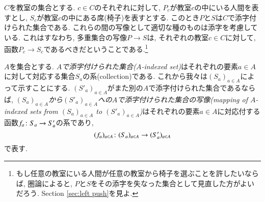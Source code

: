 \begin{example}\label{ex:classroom seats}


$C$を教室の集合とする. $c\in C$のそれぞれに対して, $P_c$が教室$c$の中にいる人間を表すとし, $S_c$が教室$c$の中にある席(椅子)を表すとする. このとき$P$と$S$は$C$で添字付けられた集合である. これらの間の写像として適切な種のものは添字を考慮している. これはすなわち, 多重集合の写像$P\to S$は, それぞれの教室$c\in C$に対して, 函数$P_c\to S_c$であるべきだということである.\footnote{もし任意の教室にいる人間が任意の教室から椅子を選ぶことを許したいならば, 圏論によると, $P$と$S$をその添字を失なった集合として見直した方がよいだろう. Section \ref{sec:left push}を見よ.}

\end{example}

\begin{definition}\label{def:indexed sets}


$A$を集合とする. \emph{$A$で添字付けられた集合($A$-indexed set)}はそれぞれの要素$a\in A$に対して対応する集合$S_a$の系(collection)である. これから我々は$(S_a)_{a\in A}$によって示すことにする. $(S'_a)_{a\in A}$がまた別の$A$で添字付けられた集合であるならば, \emph{$(S_a)_{a\in A}$から$(S'_a)_{a\in A}$への$A$で添字付けられた集合の写像(mapping of $A$-indexed sets from $(S_a)_{a\in A}$ to $(S'_a)_{a\in A}$)}はそれぞれの要素$a\in A$に対応付する函数$f_a\colon S_a\rightarrow S'_a$の系であり, $$(f_a)_{a\in A}\colon(S_a)_{a\in A}\rightarrow (S'_a)_{a\in A}$$で表す.

\end{definition}

